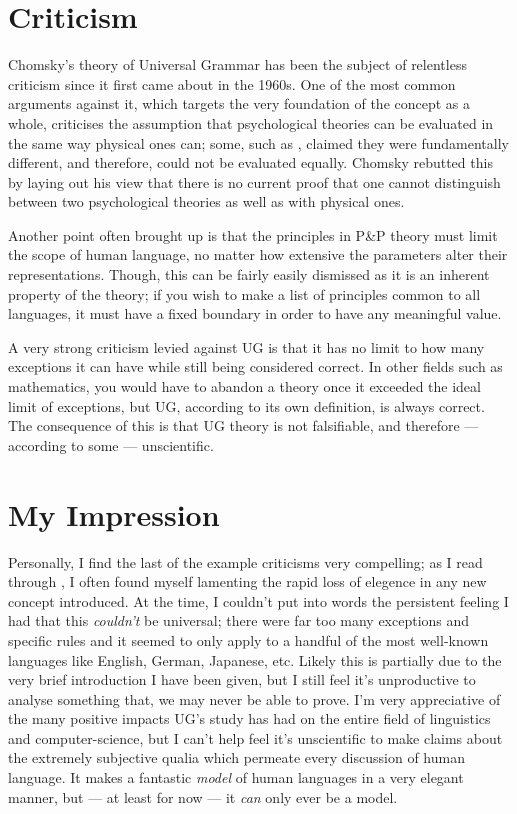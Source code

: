 \documentclass[a4paper,10pt]{article}
\begin{document}
\section{Criticism}
Chomsky's theory of Universal Grammar has been the subject of relentless criticism since it first
came about in the 1960s. One of the most common arguments against it, which targets the very foundation
of the concept as a whole, criticises the assumption that psychological theories can be evaluated in the
same way physical ones can; some, such as \citet{Quine60}, claimed they were fundamentally different,
and therefore, could not be evaluated equally. Chomsky rebutted this by laying out his view that there
is no current proof that one cannot distinguish between two psychological theories as well as with
physical ones. \citep[p.~13]{Cipriani15}

Another point often brought up is that the principles in P\&P theory must limit the scope of
human language, no matter how extensive the parameters alter their representations. Though, this
can be fairly easily dismissed as it is an inherent property of the theory; if you wish to make
a list of principles common to all languages, it must have a fixed boundary in order to have any
meaningful value. \citep[p.~13]{Cipriani15}

A very strong criticism levied against UG is that it has no limit to how many exceptions it can have
while still being considered correct. In other fields such as mathematics, you would have to abandon
a theory once it exceeded the ideal limit of exceptions, but UG, according to its own definition,
is always correct. The consequence of this is that UG theory is not falsifiable, and therefore ---
according to some --- unscientific. \citep[p.~14]{Cipriani15}


\section{My Impression}
Personally, I find the last of the example criticisms very compelling; as I read through \citet{ChUGAI},
I often found myself lamenting the rapid loss of elegence in any new concept introduced. At the time,
I couldn't put into words the persistent feeling I had that this \emph{couldn't} be universal; there
were far too many exceptions and specific rules and it seemed to only apply to a handful of the most
well-known languages like English, German, Japanese, etc. Likely this is partially due to the very brief
introduction I have been given, but I still feel it's unproductive to analyse something that, we may
never be able to prove. I'm very appreciative of the many positive impacts UG's study has had on the
entire field of linguistics and computer-science, but I can't help feel it's unscientific to make claims
about the extremely subjective qualia which permeate every discussion of human language. It makes a
fantastic \emph{model} of human languages in a very elegant manner, but --- at least for now --- it
\emph{can} only ever be a model.
\end{document}
